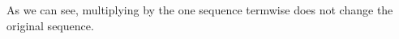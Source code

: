 \documentclass[preview]{standalone}
\begin{document}
\begin{center}
As we can see, multiplying by the one sequence termwise does not change the original sequence.
\end{center}
\end{document}
